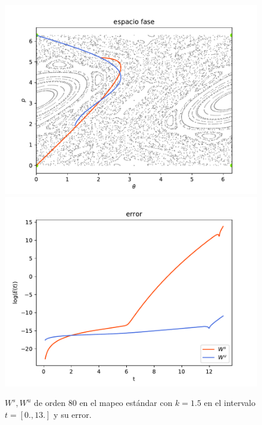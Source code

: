 \documentclass[11pt]{beamer}
\theoremstyle{definition}
\begin{document}
\begin{frame}
\begin{figure}[H]
\centering
\includegraphics[scale=0.35]{k15}
\includegraphics[scale=0.35]{errork15}
\caption{$W^{s},W^{u}$ de orden $80$ en el mapeo estándar con $k=1.5$ en el intervalo $t=[0.,13.]$ y su error.}
\label{estandar15}
\end{figure}
\end{frame}
\end{document}
